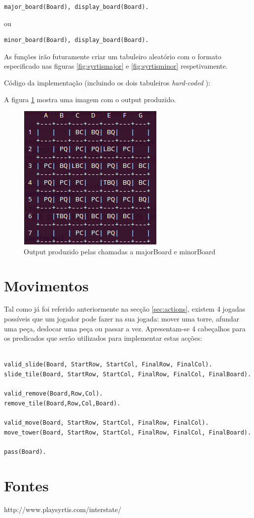\documentclass[a4paper]{article}
\begin{document}
\begin{lstlisting}
major_board(Board), display_board(Board).
\end{lstlisting}

ou

\begin{lstlisting}
minor_board(Board), display_board(Board).
\end{lstlisting}

As funções irão futuramente criar um tabuleiro aleatório com o formato especificado nas figuras \ref{fig:syrtismajor} e \ref{fig:syrtisminor} respetivamente.

Código da implementação (incluindo os dois tabuleiros \textit{hard-coded} ):



A figura \ref{fig:outputboard} mostra uma imagem com o output produzido.

\begin{figure}[h]
\centering
\includegraphics[scale=0.5]{outputboard.png}
\caption{Output produzido pelas chamadas a majorBoard e minorBoard}
\label{fig:outputboard}
\end{figure}


\section{Movimentos}

Tal como já foi referido anteriormente na secção \ref{sec:actions}, existem 4 jogadas possíveis que um jogador pode fazer na sua jogada: mover uma torre, afundar uma peça, deslocar uma peça ou passar a vez. Apresentam-se 4 cabeçalhos para os predicados que serão utilizados para implementar estas acções:

\begin{lstlisting}

valid_slide(Board, StartRow, StartCol, FinalRow, FinalCol).
slide_tile(Board, StartRow, StartCol, FinalRow, FinalCol, FinalBoard).

valid_remove(Board,Row,Col).
remove_tile(Board,Row,Col,Board).

valid_move(Board, StartRow, StartCol, FinalRow, FinalCol).
move_tower(Board, StartRow, StartCol, FinalRow, FinalCol, FinalBoard).

pass(Board).

\end{lstlisting}

\section{Fontes}

http://www.playsyrtis.com/interstate/
\end{document}
